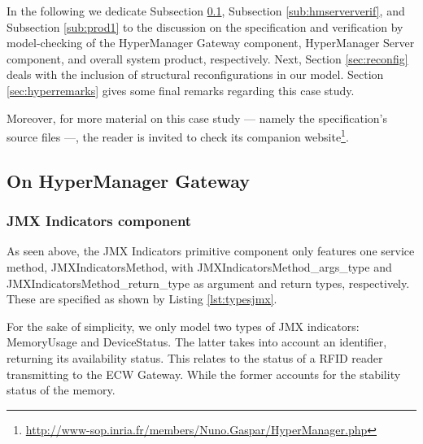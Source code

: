 		In the following we dedicate Subsection \ref{sub:hmgwverif},
		Subsection \ref{sub:hmserververif}, and Subsection \ref{sub:prod1} to the discussion
		on the specification and verification by model-checking of the \textsf{HyperManager Gateway} component,
		\textsf{HyperManager Server} component, and overall system product, respectively.
		Next, Section \ref{sec:reconfig} deals with the inclusion of structural reconfigurations
		in our model. Section \ref{sec:hyperremarks} gives some final
		remarks regarding this case study.
	
		Moreover, for more material on this case study --- namely the specification's source files ---,
		the reader is invited to check its companion 
		website\footnote{\url{http://www-sop.inria.fr/members/Nuno.Gaspar/HyperManager.php}}.	
	
	  

    

\subsection{On HyperManager Gateway}
\label{sub:hmgwverif}


\subsubsection{\textsf{JMX Indicators} component}	

	As seen above, the \textsf{JMX Indicators} primitive component only features one service method, 
	\textsf{JMXIndicatorsMethod}, with \textsf{JMXIndicatorsMethod\_args\_type} and 
	\textsf{JMXIndicatorsMethod\_return\_type} as argument and return types, respectively. These
	are specified as shown by Listing \ref{lst:typesjmx}.

				


	\noindent For the sake of simplicity, we only model two 
	types of \ac{JMX} indicators: \textsf{MemoryUsage} and \textsf{DeviceStatus}. The latter takes into account an identifier, 
	returning its availability status. This relates to the status of a \ac{RFID} reader transmitting to the \ac{ECW} Gateway.
	While the former accounts for the stability status of the memory. 
	

